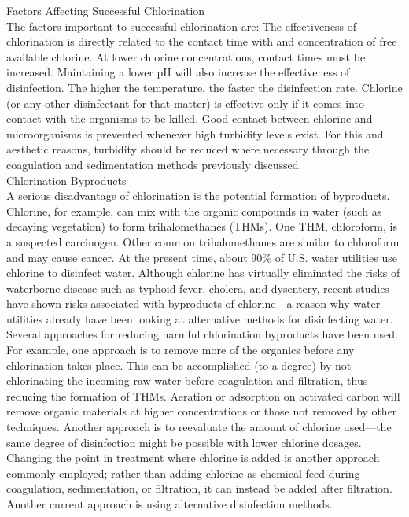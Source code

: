 Factors Affecting Successful Chlorination\\
The factors important to successful chlorination are:
The effectiveness of chlorination is directly related to the contact time with and concentration of free available chlorine. At lower chlorine concentrations, contact times must be increased. Maintaining a lower pH will also increase the effectiveness of disinfection. The higher the temperature, the faster the disinfection rate. Chlorine (or any other disinfectant for that matter) is effective only if it comes into contact with the organisms to be killed. Good contact between chlorine and microorganisms is prevented whenever high turbidity levels exist. For this and aesthetic reasons, turbidity should be reduced where necessary through the coagulation and sedimentation methods previously discussed.\\
Chlorination Byproducts\\
A serious disadvantage of chlorination is the potential formation of byproducts. Chlorine, for example, can mix with the organic compounds in water (such as decaying vegetation) to form trihalomethanes (THMs). One THM, chloroform, is a suspected carcinogen. Other common trihalomethanes are similar to chloroform and may cause cancer.
At the present time, about 90\% of U.S. water utilities use chlorine to disinfect water. Although chlorine has virtually eliminated the risks of waterborne disease such as typhoid fever, cholera, and dysentery, recent studies have shown risks associated with byproducts of chlorine—a reason why water utilities already have been looking at alternative methods for disinfecting water.
Several approaches for reducing harmful chlorination byproducts have been used. For example, one approach is to remove more of the organics before any chlorination takes place. This can be accomplished (to a degree) by not chlorinating the incoming
raw water before coagulation and filtration, thus reducing the formation of THMs. Aeration or adsorption on activated carbon will remove organic materials at higher concentrations or those not removed by other techniques. Another approach is to reevaluate the amount of chlorine used—the same degree of disinfection might be possible with lower chlorine dosages. Changing the point in treatment where chlorine is added is another approach commonly employed; rather than adding chlorine as chemical feed during coagulation, sedimentation, or filtration, it can instead be added after filtration. Another current approach is using alternative disinfection methods.\\

